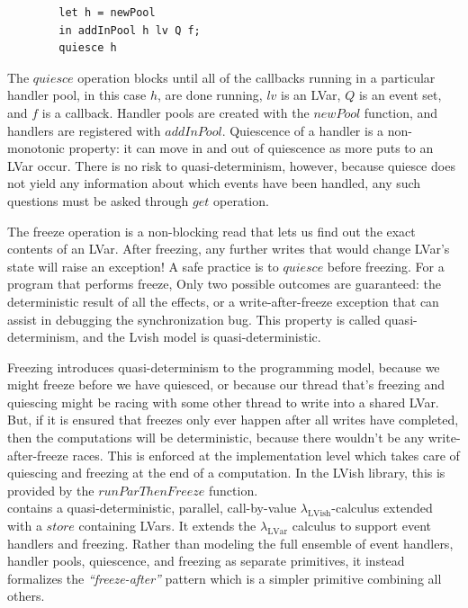\documentclass[twocolumn]{article}
\newcommand{\lambdaLVar}{\ensuremath{\lambda_{\textrm{LVar}}}}
\newcommand{\lambdaLVish}{\ensuremath{\lambda_{\textrm{LVish}}}}
\begin{document}
\begin{verbatim}
        let h = newPool
        in addInPool h lv Q f;
        quiesce h
\end{verbatim}
The $quiesce$ operation blocks until all of the callbacks running in a particular handler pool, in this case $h$, are done running, $lv$ is an LVar, $Q$ is an event set, and $f$ is a callback. Handler pools are created with the $newPool$ function, and handlers are registered with $addInPool$. Quiescence of a handler is a non-monotonic property: it can move in and out of quiescence as more puts to an LVar occur. There is no risk to quasi-determinism, however, because quiesce does not yield any information about which events have been handled, any such questions must be asked through $get$ operation. 

The freeze operation is a non-blocking read that lets us find out the exact contents of an LVar. After freezing, any further writes that would change LVar's state will raise an exception! A safe practice is to $quiesce$ before freezing. For a program that performs freeze, Only two possible outcomes are guaranteed: the deterministic result of all the effects, or a write-after-freeze exception that can assist in debugging the synchronization bug. This property is called quasi-determinism, and the Lvish model is
quasi-deterministic.

Freezing introduces quasi-determinism to the programming model, because we might freeze before we have quiesced, or because our thread that's freezing and quiescing might be racing with some other thread to write into a shared LVar. But, if it is ensured that freezes only ever happen after all writes have completed, then the computations will be deterministic, because there wouldn't be any write-after-freeze races. This is enforced at the implementation level which takes care of quiescing and
freezing at the end of a computation. In the LVish library, this is provided by the $runParThenFreeze$ function.\\
\cite{lkuper2}contains a quasi-deterministic, parallel, call-by-value $\lambdaLVish$-calculus extended with a $store$ containing LVars. It extends the $\lambdaLVar$ calculus to support event handlers and freezing. Rather than modeling the full ensemble of event handlers, handler pools, quiescence, and freezing as separate primitives, it instead formalizes the \emph{“freeze-after”} pattern which is a simpler primitive combining all others.
\end{document}

